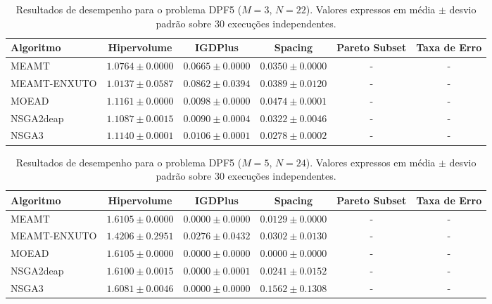 \begin{table}[htpb]
\centering
\caption{Resultados de desempenho para o problema DPF5 ($M=3$, $N=22$). Valores expressos em média $\pm$ desvio padrão sobre 30 execuções independentes.}
\label{tab:DPF5_M3_N22}
\begin{tabular}{lccccc}
\hline\hline
Algoritmo & Hipervolume & IGDPlus & Spacing & Pareto Subset & Taxa de Erro \\
\hline
MEAMT & $1.0764 \pm 0.0000$ & $0.0665 \pm 0.0000$ & $0.0350 \pm 0.0000$ & - & - \\
MEAMT-ENXUTO & $1.0137 \pm 0.0587$ & $0.0862 \pm 0.0394$ & $0.0389 \pm 0.0120$ & - & - \\
MOEAD & $1.1161 \pm 0.0000$ & $0.0098 \pm 0.0000$ & $0.0474 \pm 0.0001$ & - & - \\
NSGA2deap & $1.1087 \pm 0.0015$ & $0.0090 \pm 0.0004$ & $0.0322 \pm 0.0046$ & - & - \\
NSGA3 & $1.1140 \pm 0.0001$ & $0.0106 \pm 0.0001$ & $0.0278 \pm 0.0002$ & - & - \\
\hline\hline
\end{tabular}
\end{table}

\begin{table}[htpb]
\centering
\caption{Resultados de desempenho para o problema DPF5 ($M=5$, $N=24$). Valores expressos em média $\pm$ desvio padrão sobre 30 execuções independentes.}
\label{tab:DPF5_M5_N24}
\begin{tabular}{lccccc}
\hline\hline
Algoritmo & Hipervolume & IGDPlus & Spacing & Pareto Subset & Taxa de Erro \\
\hline
MEAMT & $1.6105 \pm 0.0000$ & $0.0000 \pm 0.0000$ & $0.0129 \pm 0.0000$ & - & - \\
MEAMT-ENXUTO & $1.4206 \pm 0.2951$ & $0.0276 \pm 0.0432$ & $0.0302 \pm 0.0130$ & - & - \\
MOEAD & $1.6105 \pm 0.0000$ & $0.0000 \pm 0.0000$ & $0.0000 \pm 0.0000$ & - & - \\
NSGA2deap & $1.6100 \pm 0.0015$ & $0.0000 \pm 0.0001$ & $0.0241 \pm 0.0152$ & - & - \\
NSGA3 & $1.6081 \pm 0.0046$ & $0.0000 \pm 0.0000$ & $0.1562 \pm 0.1308$ & - & - \\
\hline\hline
\end{tabular}
\end{table}

